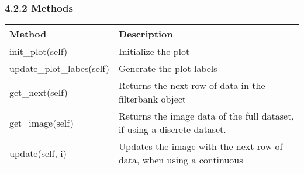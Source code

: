 \documentclass[]{article}
\begin{document}
\subsubsection{4.2.2 Methods}\label{methods}

\begin{longtable}[]{@{}ll@{}}
\toprule
\begin{minipage}[b]{0.27\columnwidth}\raggedright\strut
Method\strut
\end{minipage} & \begin{minipage}[b]{0.67\columnwidth}\raggedright\strut
Description\strut
\end{minipage}\tabularnewline
\midrule
\endhead
\begin{minipage}[t]{0.27\columnwidth}\raggedright\strut
init\_plot(self)\strut
\end{minipage} & \begin{minipage}[t]{0.67\columnwidth}\raggedright\strut
Initialize the plot\strut
\end{minipage}\tabularnewline
\begin{minipage}[t]{0.27\columnwidth}\raggedright\strut
update\_plot\_labes(self)\strut
\end{minipage} & \begin{minipage}[t]{0.67\columnwidth}\raggedright\strut
Generate the plot labels\strut
\end{minipage}\tabularnewline
\begin{minipage}[t]{0.27\columnwidth}\raggedright\strut
get\_next(self)\strut
\end{minipage} & \begin{minipage}[t]{0.67\columnwidth}\raggedright\strut
Returns the next row of data in the filterbank object\strut
\end{minipage}\tabularnewline
\begin{minipage}[t]{0.27\columnwidth}\raggedright\strut
get\_image(self)\strut
\end{minipage} & \begin{minipage}[t]{0.67\columnwidth}\raggedright\strut
Returns the image data of the full dataset, if using a discrete
dataset.\strut
\end{minipage}\tabularnewline
\begin{minipage}[t]{0.27\columnwidth}\raggedright\strut
update(self, i)\strut
\end{minipage} & \begin{minipage}[t]{0.67\columnwidth}\raggedright\strut
Updates the image with the next row of data, when using a continuous

\end{minipage}
\end{longtable}
\end{document}
